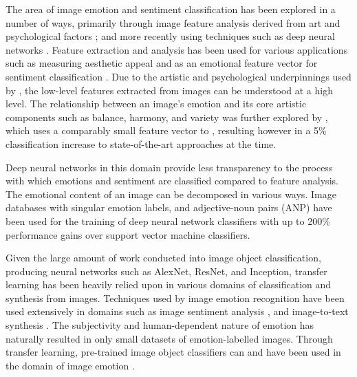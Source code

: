 \documentclass{article}
\begin{document}
The area of image emotion and sentiment classification has been explored in a number of ways, primarily through image feature analysis derived from art and psychological factors \citep{machajdik2010affective}; and more recently using techniques such as deep neural networks \citep{chen2015learning, kim2018building}.
Feature extraction and analysis has been used for various applications such as measuring aesthetic appeal \citep{den2010using,den2010comparing,den2011evolving} and as an emotional feature vector for sentiment classification \citep{machajdik2010affective}.
Due to the artistic and psychological underpinnings used by \citet{machajdik2010affective}, the low-level features extracted from images can be understood at a high level.
The relationship between an image's emotion and its core artistic components such as balance, harmony, and variety was further explored by \citet{zhao2014exploring}, which uses a comparably small feature vector to \citet{machajdik2010affective}, resulting however in a 5\% classification increase to state-of-the-art approaches at the time.

Deep neural networks in this domain provide less transparency to the process with which emotions and sentiment are classified compared to feature analysis.
The emotional content of an image can be decomposed in various ways.
Image databases with singular emotion labels, and adjective-noun pairs (ANP) have been used for the training of deep neural network classifiers \citep{chen2014deepsentibank, yang2018visual} with up to 200\% performance gains over support vector machine classifiers.

Given the large amount of work conducted into image object classification, producing neural networks such as AlexNet, ResNet, and Inception, transfer learning has been heavily relied upon in various domains of classification and synthesis from images.
Techniques used by image emotion recognition have been used extensively in domains such as image sentiment analysis \citep{you2015robust}, and image-to-text synthesis \citep{vinyals2015show}.
The subjectivity and human-dependent nature of emotion has naturally resulted in only small datasets of emotion-labelled images.
Through transfer learning, pre-trained image object classifiers can and have been used in the domain of image emotion \citep{kim2018building, wangarttalk}.
\end{document}
